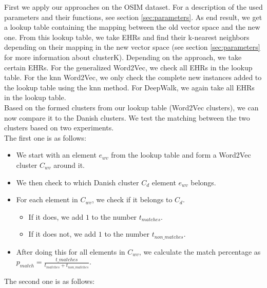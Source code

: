 First we apply our approaches on the OSIM dataset. For a description of the used parameters and their functions, see section \ref{sec:parameters}. As end result, we get a lookup table containing the mapping between the old vector space and the new one. From this lookup table, we take EHRs and find their k-nearest neighbors depending on their mapping in the new vector space (see section \ref{sec:parameters} for more information about clusterK). Depending on the approach, we take certain EHRs. For the generalized Word2Vec, we check all EHRs in the lookup table. For the knn Word2Vec, we only check the complete new instances added to the lookup table using the knn method. For DeepWalk, we again take all EHRs in the lookup table. \\

Based on the formed clusters from our lookup table (Word2Vec clusters), we can now compare it to the Danish clusters. We test the matching between the two clusters based on two experiments. \\
The first one is as follows:

\begin{itemize}

\item We start with an element $e_{wv}$ from the lookup table and form a Word2Vec cluster $C_{wv}$ around it.
\item We then check to which Danish cluster $C_d$ element $e_{wv}$ belongs.
\item For each element in $C_{wv}$, we check if it belongs to $C_d$.
\begin{itemize}
\item If it does, we add $1$ to the number $t_{matches}$.
\item If it does not, we add $1$ to the number $t_{non\_matches}$.
\end{itemize}
\item After doing this for all elements in $C_{wv}$, we calculate the match percentage as $p_{match} = \frac{t\_{matches}}{t_{matches} + t_{non\_matches}}$.

\end{itemize}

The second one is as follows:

